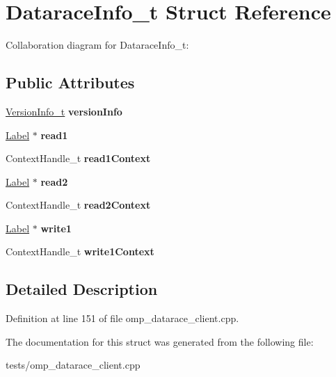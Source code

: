 \hypertarget{structDataraceInfo__t}{\section{Datarace\-Info\-\_\-t Struct Reference}
\label{structDataraceInfo__t}
}


Collaboration diagram for Datarace\-Info\-\_\-t\-:
\subsection*{Public Attributes}
\begin{DoxyCompactItemize}
\item 
\hypertarget{structDataraceInfo__t_ab36194d14a285340d69b6ae632578aac}{\hyperlink{structVersionInfo__t}{Version\-Info\-\_\-t} {\bfseries version\-Info}}\label{structDataraceInfo__t_ab36194d14a285340d69b6ae632578aac}

\item 
\hypertarget{structDataraceInfo__t_ae5052c95ee3544f641057f4a94c7622e}{\hyperlink{classLabel}{Label} $\ast$ {\bfseries read1}}\label{structDataraceInfo__t_ae5052c95ee3544f641057f4a94c7622e}

\item 
\hypertarget{structDataraceInfo__t_a057145e3b0a74bdd1a6387423c5cae7a}{Context\-Handle\-\_\-t {\bfseries read1\-Context}}\label{structDataraceInfo__t_a057145e3b0a74bdd1a6387423c5cae7a}

\item 
\hypertarget{structDataraceInfo__t_addb7e5a4795b99a668ca77030804a2c9}{\hyperlink{classLabel}{Label} $\ast$ {\bfseries read2}}\label{structDataraceInfo__t_addb7e5a4795b99a668ca77030804a2c9}

\item 
\hypertarget{structDataraceInfo__t_a4ccb7c8a6c162796812a365706ab3b62}{Context\-Handle\-\_\-t {\bfseries read2\-Context}}\label{structDataraceInfo__t_a4ccb7c8a6c162796812a365706ab3b62}

\item 
\hypertarget{structDataraceInfo__t_a7427c9360d286bfa6fc47edbca0be95a}{\hyperlink{classLabel}{Label} $\ast$ {\bfseries write1}}\label{structDataraceInfo__t_a7427c9360d286bfa6fc47edbca0be95a}

\item 
\hypertarget{structDataraceInfo__t_a7fce4fa243d730e209c41de80cee9570}{Context\-Handle\-\_\-t {\bfseries write1\-Context}}\label{structDataraceInfo__t_a7fce4fa243d730e209c41de80cee9570}

\end{DoxyCompactItemize}


\subsection{Detailed Description}


Definition at line 151 of file omp\-\_\-datarace\-\_\-client.\-cpp.



The documentation for this struct was generated from the following file\-:\begin{DoxyCompactItemize}
\item 
tests/omp\-\_\-datarace\-\_\-client.\-cpp\end{DoxyCompactItemize}
